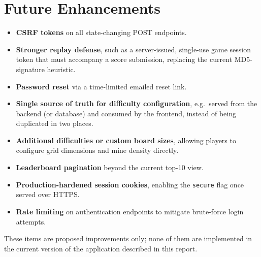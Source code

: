 \chapter{Future Enhancements}
\label{ch:future}

\begin{itemize}[nosep]
    \item \textbf{CSRF tokens} on all state-changing POST endpoints.
    \item \textbf{Stronger replay defense}, such as a server-issued,
    single-use game session token that must accompany a score submission,
    replacing the current MD5-signature heuristic.
    \item \textbf{Password reset} via a time-limited emailed reset link.
    \item \textbf{Single source of truth for difficulty configuration},
    e.g.\ served from the backend (or database) and consumed by the
    frontend, instead of being duplicated in two places.
    \item \textbf{Additional difficulties or custom board sizes}, allowing
    players to configure grid dimensions and mine density directly.
    \item \textbf{Leaderboard pagination} beyond the current top-10 view.
    \item \textbf{Production-hardened session cookies}, enabling the
    \texttt{secure} flag once served over HTTPS.
    \item \textbf{Rate limiting} on authentication endpoints to mitigate
    brute-force login attempts.
\end{itemize}

These items are proposed improvements only; none of them are implemented in
the current version of the application described in this report.
